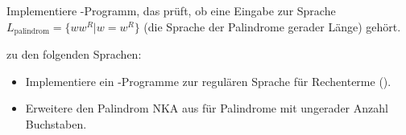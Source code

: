 \documentclass[fontsize=10pt, a4paper, ngerman]{scrartcl}
\begin{document}
\begin{aufgabe}[subtitle=Implementierung eines NKA: Palindrome]
\label{aufg:py-nka}
Implementiere -Programm, das prüft, ob eine Eingabe zur Sprache
$L_\text{palindrom} = \{ ww^R | w = w^{R} \}$ (die Sprache der Palindrome gerader
Länge) gehört.
\begin{center}
	\begin{transitiongraph}[pa]

	\end{transitiongraph}
\end{center}
\end{aufgabe}

\begin{aufgabe*}[subtitle=Weitere Aufgaben,icon=\iconStern]
\label{aufg:py-weitere}
 zu den folgenden Sprachen:
\begin{itemize}
	\item Implementiere ein -Programme zur regulären Sprache für Rechenterme ().
	\item Erweitere den Palindrom NKA aus  für Palindrome mit ungerader Anzahl Buchstaben.
\end{itemize}
\end{aufgabe*}
\end{document}

